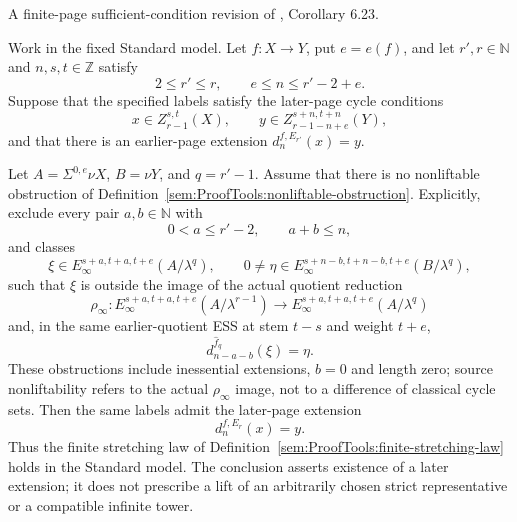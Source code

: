 \begin{corollary}
\label{paper:6.23}
A finite-page sufficient-condition revision of \cite{LWX126}, Corollary 6.23.\par
\label{cor:dfc6043e}
Work in the fixed Standard model. Let $f:X\to Y$, put $e=e(f)$, and let $r',r\in\mathbb N$ and $n,s,t\in\mathbb Z$ satisfy
\[
2\le r'\le r,\qquad e\le n\le r'-2+e.
\]
Suppose that the specified labels satisfy the later-page cycle conditions
\[
x\in Z_{r-1}^{s,t}(X),\qquad
y\in Z_{r-1-n+e}^{s+n,t+n}(Y),
\]
and that there is an earlier-page extension $d_n^{f,E_{r'}}(x)=y$.

Let $A=\Sigma^{0,e}\nu X$, $B=\nu Y$, and $q=r'-1$. Assume that there is no nonliftable obstruction of Definition~\ref{sem:ProofTools:nonliftable-obstruction}. Explicitly, exclude every pair $a,b\in\mathbb N$ with
\[
0<a\le r'-2,\qquad a+b\le n,
\]
and classes
\[
\xi\in E_\infty^{s+a,t+a,t+e}(A/\lambda^q),\qquad
0\ne\eta\in E_\infty^{s+n-b,t+n-b,t+e}(B/\lambda^q),
\]
such that $\xi$ is outside the image of the actual quotient reduction
\[
\rho_\infty:E_\infty^{s+a,t+a,t+e}(A/\lambda^{r-1})
\longrightarrow E_\infty^{s+a,t+a,t+e}(A/\lambda^q)
\]
and, in the same earlier-quotient ESS at stem $t-s$ and weight $t+e$,
\[
d_{n-a-b}^{\hat f_q}(\xi)=\eta.
\]
These obstructions include inessential extensions, $b=0$ and length zero; source nonliftability refers to the actual $\rho_\infty$ image, not to a difference of classical cycle sets. Then the same labels admit the later-page extension
\[
d_n^{f,E_r}(x)=y.
\]
Thus the finite stretching law of Definition~\ref{sem:ProofTools:finite-stretching-law} holds in the Standard model. The conclusion asserts existence of a later extension; it does not prescribe a lift of an arbitrarily chosen strict representative or a compatible infinite tower.
\end{corollary}

